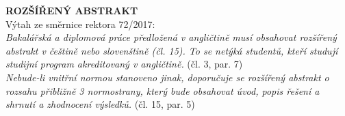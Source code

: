 \cleardoublepage
\noindent
{\large\sffamily\bfseries\MakeUppercase{Rozšířený abstrakt}}
\\
Výtah ze směrnice rektora 72/2017:\\
\emph{Bakalářská a diplomová práce předložená v angličtině musí obsahovat rozšířený abstrakt v češtině
nebo slovenštině (čl. 15). To se netýká studentů, kteří studují studijní program akreditovaný v
angličtině.}
(čl. 3, par. 7)\\
\emph{Nebude-li vnitřní normou stanoveno jinak, doporučuje se rozšířený abstrakt o rozsahu přibližně 3
normostrany, který bude obsahovat úvod, popis řešení a shrnutí a zhodnocení výsledků.}
(čl. 15, par. 5)